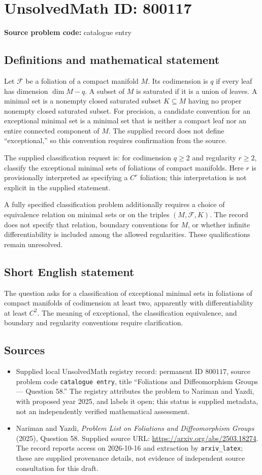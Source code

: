 \documentclass[11pt]{article}
\begin{document}
\section*{UnsolvedMath ID: 800117}
\textbf{Source problem code:} catalogue entry
\subsection{Definitions and mathematical statement}
Let \(\mathcal F\) be a foliation of a compact manifold \(M\). Its codimension is \(q\) if every leaf has dimension \(\dim M-q\). A subset of \(M\) is saturated if it is a union of leaves. A minimal set is a nonempty closed saturated subset \(K\subseteq M\) having no proper nonempty closed saturated subset. For precision, a candidate convention for an exceptional minimal set is a minimal set that is neither a compact leaf nor an entire connected component of \(M\). The supplied record does not define ``exceptional,'' so this convention requires confirmation from the source.

The supplied classification request is: for codimension \(q\geq 2\) and regularity \(r\geq 2\), classify the exceptional minimal sets of foliations of compact manifolds. Here \(r\) is provisionally interpreted as specifying a \(C^r\) foliation; this interpretation is not explicit in the supplied statement.

A fully specified classification problem additionally requires a choice of equivalence relation on minimal sets or on the triples \((M,\mathcal F,K)\). The record does not specify that relation, boundary conventions for \(M\), or whether infinite differentiability is included among the allowed regularities. These qualifications remain unresolved.
\subsection{Short English statement}
The question asks for a classification of exceptional minimal sets in foliations of compact manifolds of codimension at least two, apparently with differentiability at least \(C^2\). The meaning of exceptional, the classification equivalence, and boundary and regularity conventions require clarification.
\subsection{Sources}
\begin{itemize}
\item Supplied local UnsolvedMath registry record: permanent ID \(800117\), source problem code \texttt{catalogue entry}, title ``Foliations and Diffeomorphism Groups --- Question 58.'' The registry attributes the problem to Nariman and Yazdi, with proposed year 2025, and labels it open; this status is supplied metadata, not an independently verified mathematical assessment.
\item Nariman and Yazdi, \emph{Problem List on Foliations and Diffeomorphism Groups} (2025), Question 58. Supplied source URL: \url{https://arxiv.org/abs/2503.18274}. The record reports access on 2026-10-16 and extraction by \texttt{arxiv\_latex}; these are supplied provenance details, not evidence of independent source consultation for this draft.
\end{itemize}
\end{document}
